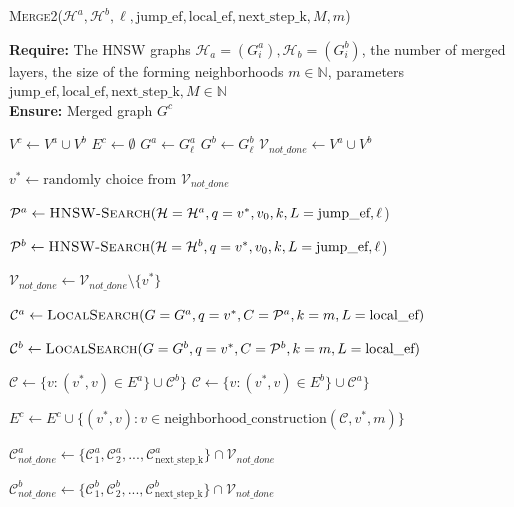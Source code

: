 \documentclass{article}
\begin{document}
\begin{algorithm}
\caption{\textsc{Merge2}($\mathcal{H}^a, \mathcal{H}^b,  \ell, \text{jump\_ef}, \text{local\_ef}, \text{next\_step\_k}, M, m$)}\label{alg:merge2}
\textbf{Require:} The HNSW graphs $\mathcal{H}_a = (G^a_i), \mathcal{H}_b = (G^b_i)$, the number of merged layers, the size of the forming neighborhoods $m \in \mathbb{N} $, parameters $\text{jump\_ef}, \text{local\_ef}, \text{next\_step\_k}, M \in \mathbb{N}$ \\
\textbf{Ensure:}  Merged graph $G^c$ 
\begin{algorithmic}[1]

\State $V^c \gets V^a \cup V^b$
\State $E^c \gets \emptyset$
\State $G^a \gets G^a_{\ell} $
\State $G^b \gets G^b_{\ell} $
\State $\mathcal{V}_{not\_done} \gets V^a \cup V^b$

    \State $v^* \gets \text{randomly choice from } \mathcal{V}_{not\_done}$

    \State $\mathcal{P}^a  \gets \textsc{HNSW-Search}(\mathcal{H}=\mathcal{H}^a, q=v^*, v_0, k, L=\text{jump\_ef}, \ell $)

    \State $\mathcal{P}^b \gets \textsc{HNSW-Search}(\mathcal{H}=\mathcal{H}^b, q=v^*, v_0, k, L=\text{jump\_ef}, \ell $)
    
    
        \State $\mathcal{V}_{not\_done} \gets \mathcal{V}_{not\_done} \setminus \{v^*\}$
        

        \State $ \mathcal{C}^a  \gets \textsc{LocalSearch}(G=G^a, q=v^*, C=\mathcal{P}^a  , k=m, L=\text{local\_ef})$
        
        \State $\mathcal{C}^b \gets \textsc{LocalSearch}(G=G^b, q=v^*, C=\mathcal{P}^b , k=m, L=\text{local\_ef})$
        
            \State $\mathcal{C}\gets  \{v : (v^*, v) \in E^a \} \cup  \mathcal{C}^b\}$
        \Else
            \State $\mathcal{C} \gets  \{v : (v^*, v) \in E^b \} \cup  \mathcal{C}^a\}$
        \EndIf
        
        \State $E^c \gets E^c \cup \{ (v^*, v) : v \in \text{neighborhood\_construction}(\mathcal{C}, v^*, m) \}$
        
        \State $\mathcal{C}^a_{not\_done} \gets \{\mathcal{C}^a_1, \mathcal{C}^a_2, ..., \mathcal{C}^a_{ \text{next\_step\_k} } \} \cap \mathcal{V}_{not\_done}$

        \State $\mathcal{C}^b_{not\_done} \gets \{\mathcal{C}^b_1, \mathcal{C}^b_2, ..., \mathcal{C}^b_{ \text{next\_step\_k} } \}  \cap \mathcal{V}_{not\_done}$
        

\end{algorithmic}
\end{algorithm}
\end{document}
